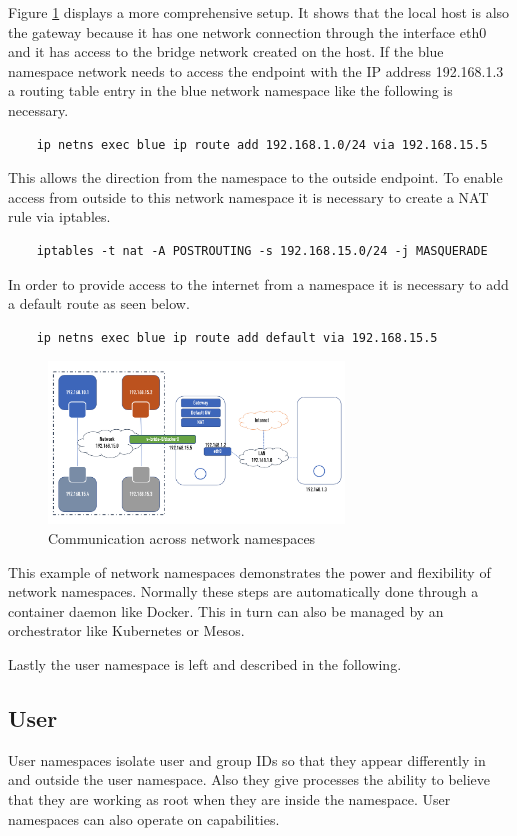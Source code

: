 Figure \ref{sec:intro:containerization:linux_namespaces:netowork_ns_out} displays a more comprehensive setup. 
It shows that the local host is also the gateway because it has one network connection through the interface eth0 and it has access to the bridge network created on the host. 
If the blue namespace network needs to access the endpoint with the IP address 192.168.1.3 a routing table entry in the blue network namespace like the following is necessary.
\begin{lstlisting}
	ip netns exec blue ip route add 192.168.1.0/24 via 192.168.15.5
\end{lstlisting}
This allows the direction from the namespace to the outside endpoint. To enable access from outside to this network namespace it is necessary to create a NAT rule via iptables.
\begin{lstlisting}
	iptables -t nat -A POSTROUTING -s 192.168.15.0/24 -j MASQUERADE	
\end{lstlisting}
In order to provide access to the internet from a namespace it is necessary to add a default route as seen below.
\begin{lstlisting}
	ip netns exec blue ip route add default via 192.168.15.5
\end{lstlisting}
\begin{figure}[htbp]
 \centering
 \includegraphics[width=0.7\textwidth]{gfx/examples/network_ns_out}
 \caption{Communication across network namespaces}
\label{sec:intro:containerization:linux_namespaces:netowork_ns_out}
\end{figure}
This example of network namespaces demonstrates the power and flexibility of network namespaces.
Normally these steps are automatically done through a container daemon like Docker. This in turn can also be managed by an orchestrator like Kubernetes or Mesos.

Lastly the user namespace is left and described in the following.

\subsection{User}
\label{sec:intro:containerization:linux_namespaces:user_namespaces}
User namespaces isolate user and group IDs so that they appear differently in and outside the user namespace.
Also they give processes the ability to believe that they are working as root when they are inside the namespace.
User namespaces can also operate on capabilities. 

